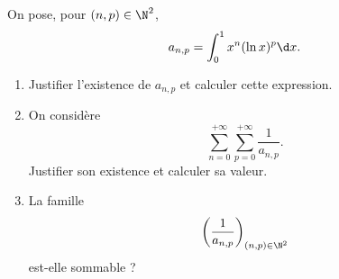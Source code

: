 \begin{enonce}
\begin{exercise}[ID={RMS135 E1478},subtitle={CCINP MP 2024},tags={},difficulty={}]

On pose, pour $(n,p) \in \N^2$,
\begin{equation*}
a_{n,p} = \int_0^1 x^n (\ln x)^p \d x.
\end{equation*}

\begin{enumerate}
  \item Justifier l’existence de $a_{n,p}$ et calculer cette expression.
  \item On considère 
  \begin{equation*}
  \sum_{n=0}^{+\infty} \sum_{p=0}^{+\infty} \frac{1}{a_{n,p}}.
  \end{equation*}
  Justifier son existence et calculer sa valeur.
  \item La famille 
  \begin{equation*}
  \left( \frac{1}{a_{n,p}} \right)_{(n,p) \in \N^2}
  \end{equation*}
  est-elle sommable ?
\end{enumerate}

\end{exercise}
\begin{solution}
\end{solution}
\end{enonce}
